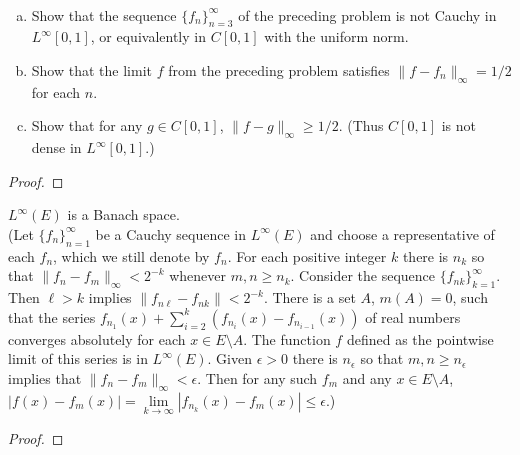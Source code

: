 \begin{pblm}~ %
	\begin{enumerate}[(a)]
	\item Show that the sequence $\{f_n\}_{n=3}^\infty$ of the preceding problem is not 
		Cauchy in $L^\infty[0,1]$, or equivalently in $C[0,1]$ with the uniform norm. 
	\item Show that the limit $f$ from the preceding problem satisfies $\|f - f_n\|_\infty = 1/2$ 
		for each $n$. 
	\item Show that for any $g \in C[0,1]$, $\|f - g\|_\infty \ge 1/2$. (Thus $C[0,1]$ is not 
		dense in $L^\infty[0,1]$.)
	\end{enumerate}
\begin{proof}
\end{proof}
\end{pblm}

\begin{pblm} %
	$L^\infty(E)$ is a Banach space. \\
	(Let $\{f_n\}_{n=1}^\infty$ be a Cauchy sequence in $L^\infty(E)$ and choose a representative 
	of each $f_n$, which we still denote by $f_n$. For each positive integer $k$ there is $n_k$ 
	so that $\|f_n - f_m\|_\infty < 2^{-k}$ whenever $m, n \ge n_k$. Consider the sequence 
	$\{f_{nk}\}_{k=1}^\infty$. Then $\ell > k$ implies $\|f_{n\ell} - f_{nk}\| < 2^{-k}$. There is 
	a set $A$, $m(A) = 0$, such that the series $f_{n_1}(x) + \sum\limits_{i=2}^k (f_{n_i}(x) - f_{n_{i-1}}(x))$ 
	of real numbers converges absolutely for each $x \in E\setminus A$. The function $f$ defined as 
	the pointwise limit of this series is in $L^\infty(E)$. Given $\epsilon > 0$ there is 
	$n_\epsilon$ so that $m, n \ge n_\epsilon$ implies that $\|f_n - f_m\|_\infty < \epsilon$. Then 
	for any such $f_m$ and any $x \in E\setminus A$, $|f(x) - f_m(x)| = 
	\lim\limits_{k\to\infty}|f_{n_k}(x) - f_m(x)|\le\epsilon$.)
\begin{proof}
\end{proof}
\end{pblm}

